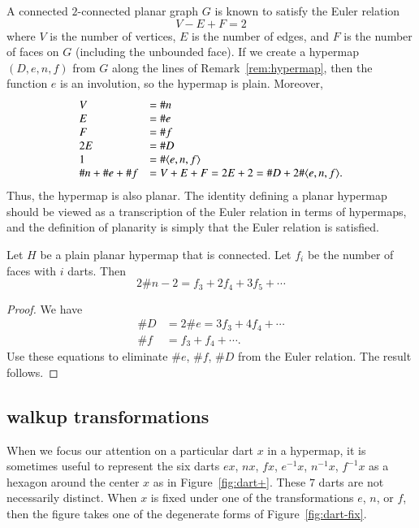 \begin{remark}  A connected $2$-connected
planar graph $G$ is known to satisfy the Euler relation
    $$ V - E + F = 2$$
where $V$ is the number of vertices, $E$ is the number of edges, and
$F$ is the number of faces on $G$ (including the unbounded face). If
we create a hypermap $(D,e,n,f)$ from $G$ along the lines of
Remark~\ref{rem:hypermap}, then the function $e$ is an involution,
so the hypermap is plain. Moreover,
    $$\begin{array}{lll}
    V &= \# n\\
    E &= \# e\\
    F &= \# f\\
    2E &= \# D\\
    1 &= \#\langle e,n,f\rangle\\
    \# n + \#e + \# f &= V + E + F = 2 E + 2 = \# D + 2 \#\langle e,n,f\rangle.
    \end{array}
    $$
Thus, the hypermap is also planar.  The identity defining a planar
hypermap should be viewed as a transcription of the Euler relation
in terms of hypermaps, and the definition of planarity is simply
that the Euler relation is satisfied.
\end{remark}

\begin{lemma}  Let $H$ be a plain planar hypermap that is connected.
Let $f_i$ be the number of faces with $i$ darts.  Then
    $$2 \# n - 2 =  f_3 + 2 f_4 + 3 f_5 +\cdots$$
\end{lemma}

\begin{proof}  We have
    $$
    \begin{array}{lll}
     \# D &= 2 \# e = 3 f_3 + 4 f_4 + \cdots\\
    \# f &= f_3 + f_4 + \cdots.
    \end{array}
    $$
Use these equations to eliminate $\#e$, $\#f$, $\#D$ from the Euler
relation.  The result follows.
\end{proof}



\subsection{walkup transformations}

When we focus our attention on a particular dart $x$ in a
hypermap, it is sometimes useful to represent the six darts $e x$,
$n x$, $f x$, $e^{-1} x$, $n^{-1} x$, $f^{-1} x$ as a hexagon
around the center $x$ as in Figure~\ref{fig:dart+}.  These $7$
darts are not necessarily distinct.   When $x$ is fixed under one
of the transformations $e$, $n$, or $f$, then the figure takes one
of the degenerate forms of Figure~\ref{fig:dart-fix}.


